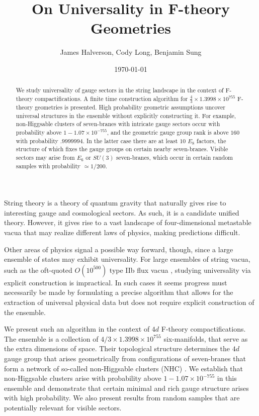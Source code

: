 \documentclass[aps,prl,twocolumn, superscriptaddress,groupedaddress,nofootinbib]{revtex4-1}
\begin{document}
\title{On Universality in F-theory Geometries}
\author{James Halverson, Cody Long, Benjamin Sung}

\date{\today}

\begin{abstract}
We study universality of gauge sectors in the string landscape
in the context of F-theory compactifications.
A finite time construction algorithm for $\frac43 \times 1.3998 \times 10^{755}$ F-theory geometries is presented. High probability geometric
assumptions uncover universal structures in the ensemble without
explicitly constructing it. For example, non-Higgsable clusters
of seven-branes with intricate gauge sectors occur with
probability above $1-1.07\times 10^{-755}$,  and
the geometric gauge group rank is above $160$ with probability
$.9999994$. In the latter case there are at least $10$ $E_8$
factors, the structure of which fixes the gauge groups
on certain nearby seven-branes. Visible sectors may arise from $E_6$ or $SU(3)$ seven-branes, which occur
in certain random samples with probability $\simeq 1/200$.
\end{abstract}

\maketitle


String theory is a theory of quantum gravity that naturally
gives rise to interesting gauge and cosmological sectors. As
such, it is a candidate unified theory. However, it gives
rise to a vast landscape of four-dimensional metastable vacua that
may realize different laws of physics, making predictions difficult.


Other areas of physics signal a possible way forward, though,
since a large ensemble of states may exhibit universality.
For large ensembles of string vacua, such as the oft-quoted $O(10^{500})$ type IIb flux vacua 
\cite{Bousso:2000xa,*Ashok:2003gk,*Denef:2004ze},
studying universality via explicit construction is impractical. In such cases
it seems progress must necessarily be made by formulating a precise algorithm
that allows for the extraction of universal physical data but does not require 
explicit
construction of the ensemble.

We present such an algorithm in the context of $4d$ F-theory \cite{Vafa:1996xn,*Morrison:1996pp,*Morrison:1996pp}
compactifications. The ensemble is a collection of
$4/3\times 1.3998\times 10^{755}$ six-manifolds, that serve as the extra dimensions of space. Their topological structure determines the $4d$ gauge group that arises 
geometrically from
configurations of seven-branes that form a network of so-called non-Higgsable
clusters (NHC) \cite{Morrison:2012np}. We establish that non-Higgsable clusters arise with
probability above $1-1.07\times 10^{-755}$ in this ensemble and demonstrate that 
certain minimal and rich gauge structure arises with high probability. We also
present results from random samples that are potentially relevant for
visible sectors.
\end{document}
